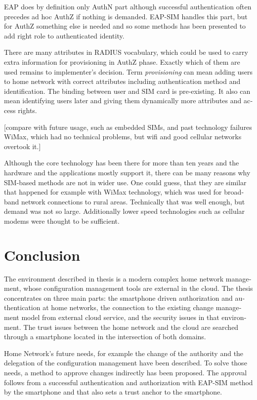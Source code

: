 \documentclass[12pt,a4paper,english]{tutthesis}
\begin{document}
\begin{otherlanguage}{english}
EAP does by definition only AuthN part although successful
authentication often precedes ad hoc AuthZ if nothing is demanded.
EAP-SIM handles this part, but for AuthZ something else is needed
and so some methods has been presented to add right role to 
authenticated identity.

There are many attributes in RADIUS vocabulary, which could be 
used to carry extra information for provisioning in AuthZ phase. Exactly which
of them are used remains to implementer's  decision.
Term \emph{provisioning} can mean adding users to home network with correct
attributes including authentication method and identification.
The binding between user and SIM card is pre-existing.
It also can mean identifying users later and giving them 
dynamically more attributes and access rights.

[compare with future usage, such as embedded SIMs, and past technology 
failures WiMax, which had no technical problems, but wifi and good
cellular networks overtook it.]

Although the core technology has been there for more than ten years and
the hardware and the applications mostly support it, 
there can be many reasons why SIM-based methods are not in wider use. 
One could guess, that they are similar that happened for example with 
WiMax technology, which was used for broadband network connections to
rural areas. Technically that was well enough, but demand was not so
large. Additionally lower speed technologies such as cellular modems
were thought to be sufficient.


\chapter{Conclusion}
\label{sec-7}



The environment described in thesis is a modern complex home network
management, whose configuration management tools are external in the
cloud.  The thesis concentrates on three main parts:
the smartphone driven authorization and authentication at home
networks, the connection to the existing change management model from
external cloud service, and the security issues in that environment.
The trust issues between the home network and the cloud are searched
through a smartphone located in the intersection of both domains.

Home Network's future needs, for example the change of the authority
and the delegation of the configuration management have been
described.
To solve those needs, a method to approve changes indirectly has been
proposed. The approval follows from a successful authentication and
authorization with EAP-SIM method by the smartphone and that also sets
a trust anchor to the smartphone.



\end{otherlanguage}
\end{document}
